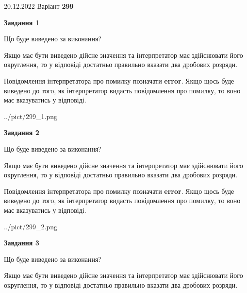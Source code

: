 \documentclass[12pt, ukrainian]{article}
\begin{document}
{20.12.2022 Варіант \No \textbf { 299 }\par}
{
\begin {Large}

{\begin {center}\textbf{Завдання 1}\end {center}}\par
Що буде виведено за виконання? \par

Якщо має бути виведено дійсне значення та інтерпретатор має здійснювати його округлення, 
то у відповіді достатньо правильно вказати два дробових розряди.

Повідомлення інтерпретатора про помилку позначати \textbf{error}.
Якщо щось буде виведено до того, як інтерпретатор видасть повідомлення про помилку, 
то воно має вказуватись у відповіді. \par

\begin{center}
	{../pict/299_1.png}
\end{center}
\newpage

{\begin {center}\textbf{Завдання 2}\end {center}}\par
Що буде виведено за виконання? \par

Якщо має бути виведено дійсне значення та інтерпретатор має здійснювати його округлення, 
то у відповіді достатньо правильно вказати два дробових розряди.

Повідомлення інтерпретатора про помилку позначати \textbf{error}.
Якщо щось буде виведено до того, як інтерпретатор видасть повідомлення про помилку, 
то воно має вказуватись у відповіді. \par

\begin{center}
	{../pict/299_2.png}
\end{center}
\newpage

{\begin {center}\textbf{Завдання 3}\end {center}}\par
Що буде виведено за виконання? \par

Якщо має бути виведено дійсне значення та інтерпретатор має здійснювати його округлення, 
то у відповіді достатньо правильно вказати два дробових розряди.


\end{Large}}
\end{document}

